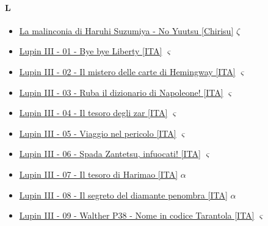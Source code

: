 		\paragraph{L} \hypertarget{SPL}{}
			\begin{itemize}
			
				\item  \href{https://mega.nz/#F!rsExXbKT!ItZhyFaeauiiJ7j_19hv5Q} {La malinconia di Haruhi Suzumiya - No Yuutsu [Chirisu]} $\zeta$   \\ 
				\item  \href{https://mega.nz/#!wqwTVZbA!c2fGRM4oDNj2fBtOhthjmjUwQaSPourKh5BfmXD7iKM} {Lupin III - 01 - Bye bye Liberty  [ITA]} $\varsigma$   \\ 
				\item  \href{https://mega.nz/#!Z2Z2VZjD!_htXNAGsJJNYwA92Gw49Q8_f-vC6ODtoaOxmm0C1d04} {Lupin III - 02 - Il mistero delle carte di Hemingway [ITA]} $\varsigma$   \\ 
				\item  \href{https://mega.nz/#!gqgHmRrK!jBYO6Y6-Cb6XbQQ-3VNwLf1aqjzOPqIkDQhqG23u1sY} {Lupin III - 03 - Ruba il dizionario di Napoleone!  [ITA]} $\varsigma$   \\ 
				\item  \href{https://mega.nz/#!N3h0SAyT!rbnCbDOxaNLOBT3-nD6jcE5wSL1opE9VfHWujT24f0E} {Lupin III - 04 - Il tesoro degli zar  [ITA]} $\varsigma$   \\ 
				\item  \href{https://mega.nz/#!V2Ax0YDL!JHLWLD4_5giFn-pdbLm6qGwPegqsCHcxG6XfR3kjIkA} {Lupin III - 05 - Viaggio nel pericolo  [ITA]} $\varsigma$   \\ 
				\item  \href{https://mega.nz/#!QmAAEK6J!-PBa6R4cjLrqxxFzRZYxXdS-lIO_ceH0QYF6HqYe1TY} {Lupin III - 06 - Spada Zantetsu, infuocati! [ITA]} $\varsigma$   \\ 
			   	\item  \href{https://mega.nz/#F!dNNFRIIR!yq45HmS2loPaqqMLz2iTtw} {Lupin III - 07 - Il tesoro di Harimao [ITA]} $\alpha$   \\ 
			    \item \href{https://mega.nz/#!JYkjHCxC!P9RAHD1-1RWrmMJlLaZ5cWAKYP9Y38Xz7OMumBfZ9AQ} {Lupin III - 08 - Il segreto del diamante penombra [ITA]} $\alpha$   \\ 
			    \item  \href{https://mega.nz/#!wnZxWbTI!_V3f6k6X2c0ghBh3s2zfsVNyrck1PRznNc42RKcdqbU} {Lupin III - 09 - Walther P38 - Nome in codice Tarantola [ITA]} $\varsigma$   \\ 

\end{itemize}
